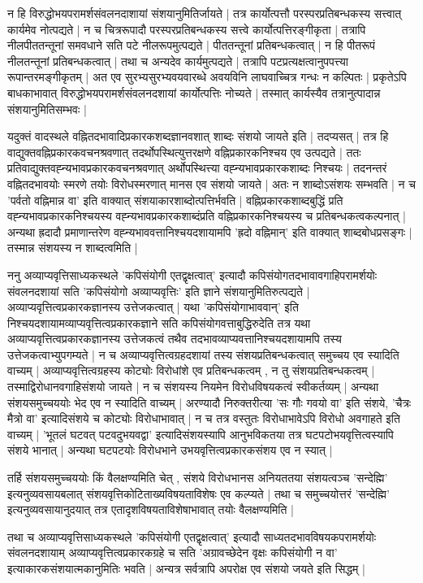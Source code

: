 न हि विरुद्धोभयपरामर्शसंवलनदाशायां संशयानुमितिर्जायते | तत्र कार्योत्पत्तौ परस्परप्रतिबन्धकस्य सत्त्वात् कार्यमेव नोत्पद्यते | न च चित्ररूपादौ परस्परप्रतिबन्धकस्य सत्त्वे कार्योत्पत्तिरङ्गीकृता | तत्रापि नीलपीततन्तूनां समवधाने सति पटे नीलरूपमुत्पद्यते | पीततन्तूनां प्रतिबन्धकत्वात् | न हि पीतरूपं नीलतन्तूनां प्रतिबन्धकत्वात् | तथा च अन्यदेव कार्यमुत्पद्यते | तत्रापि पटप्रत्यक्षत्वानुपपत्त्या रूपान्तरमङ्गीकृतम् | अत एव सुरभ्यसुरभ्यवयवारब्धे अवयविनि लाघवाच्चित्र गन्धः न कल्पितः | प्रकृतेऽपि बाधकाभावात् विरुद्धोभयपरामर्शसंवलनदशायां कार्योत्पत्तिः नोच्यते | तस्मात् कार्यस्यैव तत्रानुत्पादान्न संशयानुमितिसम्भवः |

यदुक्तं वादस्थले वह्नितदभावादिप्रकारकशब्दज्ञानवशात् शाब्दः संशयो जायते इति | तदप्यसत् | तत्र हि वाद्युक्तवह्निप्रकारकवचनश्रवणात् तदर्थोपस्थित्युत्तरक्षणे वह्निप्रकारकनिश्चय एव उत्पद्यते | ततः प्रतिवाद्युक्तवह्न्यभावप्रकारकवचनश्रवणात् अर्थोपस्थित्त्या वह्न्यभावप्रकारकशाब्दः निश्चयः | तदनन्तरं वह्नितदभावयोः स्मरणे तयोः विरोधस्मरणात् मानस एव संशयो जायते | अतः न शाब्दोऽसंशयः सम्भवति | न च 'पर्वतो वह्निमान्न वा' इति वाक्यात् संशयाकारशाब्दोत्पत्तिर्भवति | वह्निप्रकारकशाब्दबुद्धिं प्रति वह्न्यभावप्रकारकनिश्चयस्य वह्न्यभावप्रकारकशाब्दंप्रति वह्निप्रकारकनिश्चयस्य च प्रतिबन्धकत्वकल्पनात् | अन्यथा  ह्रदादौ प्रमाणान्तरेण वह्न्यभाववत्तानिश्चयदशायामपि 'ह्रदो वह्निमान्' इति वाक्यात् शाब्दबोधप्रसङ्गः | तस्मान्न संशयस्य न शाब्दत्वमिति |

ननु अव्याप्यवृत्तिसाध्यकस्थले 'कपिसंयोगी एतद्वृक्षत्वात्' इत्यादौ कपिसंयोगतदभावावगाहिपरामर्शयोः संवलनदशायां सति 'कपिसंयोगो अव्याप्यवृत्तिः' इति ज्ञाने संशयानुमितिरुत्पद्यते | अव्याप्यवृत्तित्वप्रकारकज्ञानस्य उत्तेजकत्वात् | यथा 'कपिसंयोगाभाववान्' इति निश्चयदशायामव्याप्यवृत्तित्वप्रकारकज्ञाने सति कपिसंयोगवत्ताबुद्धिरुदेति तत्र यथा अव्याप्यवृत्तित्वप्रकारकज्ञानस्य उत्तेजकत्वं तथैव तदभावव्याप्यवत्तानिश्चयदशायामपि तस्य उत्तेजकत्वाभ्युपगम्यते | न च अव्याप्यवृत्तित्वग्रहदशायां तस्य संशयप्रतिबन्धकत्वात् समुच्चय एव स्यादिति वाच्यम् | अव्याप्यवृत्तित्वग्रहस्य कोट्योः विरोधांशे एव प्रतिबन्धकत्वम् , न तु संशयप्रतिबन्धकत्वम् | तस्माद्विरोधानवगाहिसंशयो जायते | न च संशयस्य नियमेन विरोधविषयकत्वं स्वीकर्तव्यम् | अन्यथा संशयसमुच्चययोः भेद एव न स्यादिति वाच्यम् | अरण्यादौ निरुक्तरीत्या 'सः गौः गवयो वा' इति संशये, 'चैत्रः मैत्रो वा' इत्यादिसंशये च कोट्योः विरोधाभावात् | न च तत्र वस्तुतः विरोधाभावेऽपि विरोधो अवगाहते इति वाच्यम् | 'भूतलं घटवत् पटवदुभयवद्वा' इत्यादिसंशयस्यापि आनुभविकतया तत्र घटपटोभयवृत्तित्वस्यापि संशये भानात् | अन्यथा घटपटयोः विरोधभाने उभयवृत्तित्वप्रकारकसंशय एव न स्यात् | 

तर्हि संशयसमुच्चययोः किं वैलक्षण्यमिति चेत् , संशये विरोधभानस अनियततया संशयत्वञ्च 'सन्देह्मि' इत्यनुव्यवसायबलात् संशयवृत्तिकोटिताख्यविषयताविशेषः एव कल्प्यते | तथा च समुच्चयोत्तरं 'सन्देह्मि' इत्यनुव्यवसायानुदयात् तत्र एतादृशविषयताविशेषाभावात् तयोः वैलक्षण्यमिति | 

तथा च अव्याप्यवृत्तिसाध्यकस्थले 'कपिसंयोगी एतद्वृक्षत्वात्' इत्यादौ साध्यतदभावविषयकपरामर्शयोः संवलनदशायाम् अव्याप्यवृत्तित्वप्रकारकग्रहे च सति 'अग्रावच्छेदेन वृक्षः कपिसंयोगी न वा' इत्याकारकसंशयात्मकानुमितिः भवति | अन्यत्र सर्वत्रापि अपरोक्ष एव संशयो जयते इति सिद्धम्  |
